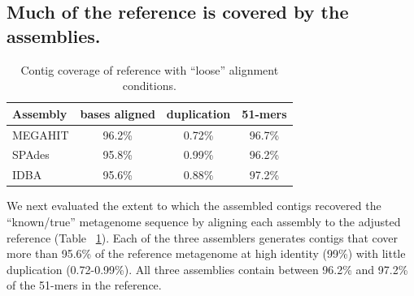 \documentclass[11pt]{article}
\begin{document}


\subsection*{Much of the reference is covered by the assemblies.}




\begin{table}[!h]
\centering
\caption{Contig coverage of reference with ``loose'' alignment conditions.}
\begin{tabular}{|l|c|c|c|}\hline
  \textbf{Assembly} & \textbf{bases aligned} & \textbf{duplication}
  & \textbf{51-mers}
  \\ \hline
MEGAHIT & 96.2\% & 0.72\% & 96.7\% \\ \hline
SPAdes  & 95.8\% & 0.99\% & 96.2\% \\ \hline
IDBA    & 95.6\% & 0.88\% & 97.2\% \\ \hline
\end{tabular}
\label{table:contig-coverage}
\end{table}


We next evaluated the extent to which the assembled contigs recovered the
``known/true'' metagenome sequence by aligning each assembly to the
adjusted reference (Table ~\ref{table:contig-coverage}).  Each of the three
assemblers generates contigs that cover more than 95.6\% of the reference
metagenome at high identity (99\%) with little duplication
(0.72-0.99\%).  All three assemblies contain between 96.2\% and 97.2\% of
the 51-mers in the reference.
\end{document}
